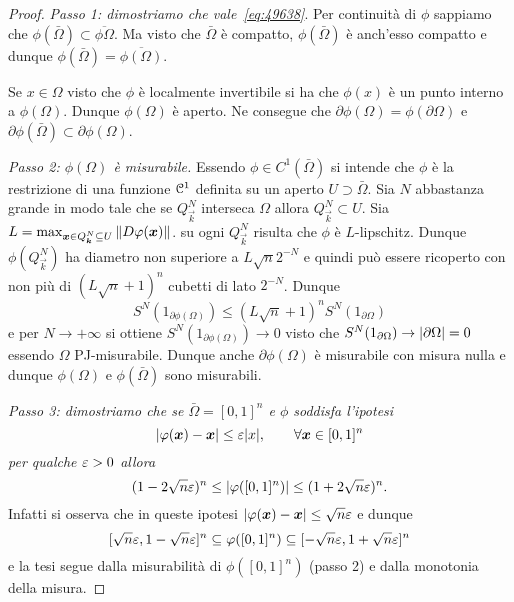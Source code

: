 \begin{proof}
\emph{Passo 1: dimostriamo che vale~\eqref{eq:49638}}.
Per continuità di $\phi$ sappiamo che 
$\phi(\bar \Omega) \subset \overline{\phi \Omega}$.
Ma visto che $\bar \Omega$ è compatto, $\phi(\bar \Omega)$ 
è anch'esso compatto e dunque $\phi(\bar \Omega) = \overline{\phi(\Omega)}$.

Se $x\in \Omega$ visto che $\phi$ è localmente invertibile 
si ha che $\phi(x)$ è un punto interno a $\phi(\Omega)$.
Dunque $\phi(\Omega)$ è aperto.
Ne consegue che $\partial \phi(\Omega) = \phi(\partial \Omega)$
e $\partial \phi(\bar \Omega) \subset \partial \phi(\Omega)$.

\emph{Passo 2: $\phi(\Omega)$ è misurabile.}
Essendo $\phi\in C^1(\bar \Omega)$ si intende che $\phi$ è la restrizione 
di una funzione $\mathcal C^1$ definita su un aperto $U\supset \bar \Omega$.
Sia $N$ abbastanza grande in modo tale che se $Q^N_{\vec k}$ interseca 
$\Omega$ allora $Q^N_{\vec k}\subset U$. 
Sia $L = \max_{\boldsymbol x \in Q^N_{\boldsymbol k}\subseteq U} {\left\Vert D\varphi(\boldsymbol x)\right\Vert}$.
su ogni $Q^N_{\vec k}$ risulta che $\phi$ è $L$-lipschitz.
Dunque $\phi(Q^N_{\vec k})$ ha diametro non superiore a 
$L \sqrt n 2^{-N}$ e quindi può essere ricoperto con non più di 
$(L\sqrt n + 1)^n$ cubetti di lato $2^{-N}$.
Dunque
\[
  S^N(1_{\partial \phi(\Omega)}) 
  \le (L\sqrt n +1)^n S^N(1_{\partial \Omega})
\]
e per $N\to +\infty$ si ottiene $S^N(1_{\partial \phi(\Omega)})\to 0$
visto che $S^N(1_{\partial \Omega})\to {\left|\partial \Omega\right|} = 0$ 
essendo $\Omega$ PJ-misurabile. 
Dunque anche $\partial\phi(\Omega)$ è misurabile con misura nulla 
e dunque $\phi(\Omega)$ e $\phi(\bar \Omega)$ sono misurabili.

\emph{Passo 3: dimostriamo che se $\bar \Omega=[0,1]^n$ e $\phi$ soddisfa
l'ipotesi
\[
  {\left|\varphi(\boldsymbol x)-\boldsymbol x\right|} \le \varepsilon{\left|x\right|}, \qquad \forall \boldsymbol x \in [0,1]^n
\]
per qualche $\varepsilon>0$ allora 
\[
  (1-2\sqrt{n}\varepsilon)^n \le {\left|\varphi([0,1]^n)\right|} \le (1+2\sqrt{n}\varepsilon)^n.
\]
}
Infatti si osserva che in queste ipotesi ${\left|\varphi(\boldsymbol x)-\boldsymbol x\right|}\le \sqrt n \varepsilon$
e dunque
\[
  [\sqrt n \varepsilon,1-\sqrt n \varepsilon]^n \subseteq \varphi([0,1]^n) \subseteq [-\sqrt n \varepsilon,1+\sqrt n \varepsilon]^n
\]
e la tesi segue dalla misurabilità di $\phi([0,1]^n)$ (passo 2)
e dalla monotonia della misura.


\end{proof}
